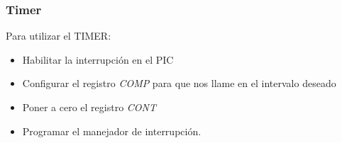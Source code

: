 \documentclass{beamer}
\begin{document}
\begin{frame}
\frametitle{Timer}
Para utilizar el TIMER:
\begin{itemize}
\item Habilitar la interrupción en el PIC
\item Configurar el registro \emph{COMP} para que nos llame en el intervalo deseado
\item Poner a cero el registro \emph{CONT}
\item Programar el manejador de interrupción.
\end{itemize}

\end{frame}
\end{document}
